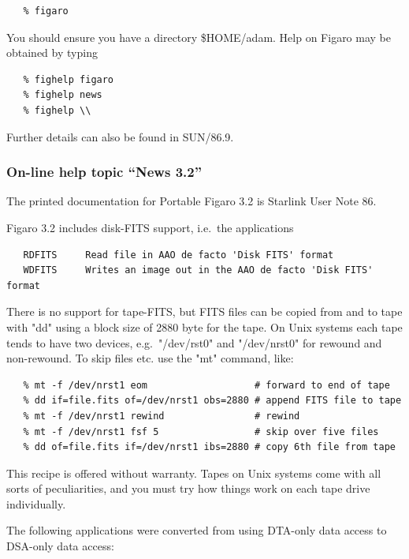 \documentclass[11pt,twoside]{article}
\begin{document}
\begin{verbatim}
   % figaro
\end{verbatim}

   You should ensure you have a directory \$HOME/adam.  Help on Figaro
   may be obtained by typing

\begin{verbatim}
   % fighelp figaro
   % fighelp news
   % fighelp \\
\end{verbatim}

   Further details can also be found in SUN/86.9.


\subsubsection{On-line help topic ``News 3.2''}

   The printed documentation for Portable Figaro 3.2 is Starlink User
   Note 86.

   Figaro 3.2 includes disk-FITS support, i.e.\ the applications

\begin{verbatim}
   RDFITS     Read file in AAO de facto 'Disk FITS' format
   WDFITS     Writes an image out in the AAO de facto 'Disk FITS' format
\end{verbatim}

   There is no support for tape-FITS, but FITS files can be copied from
   and to tape with "dd" using a block size of 2880 byte for the tape.
   On Unix systems each tape tends to have two devices, e.g.\ "/dev/rst0"
   and "/dev/nrst0" for rewound and non-rewound.  To skip files etc. use
   the "mt" command, like:

\begin{verbatim}
   % mt -f /dev/nrst1 eom                   # forward to end of tape
   % dd if=file.fits of=/dev/nrst1 obs=2880 # append FITS file to tape
   % mt -f /dev/nrst1 rewind                # rewind
   % mt -f /dev/nrst1 fsf 5                 # skip over five files
   % dd of=file.fits if=/dev/nrst1 ibs=2880 # copy 6th file from tape
\end{verbatim}

   This recipe is offered without warranty.  Tapes on Unix systems come
   with all sorts of peculiarities, and you must try how things work on
   each tape drive individually.

   The following applications were converted from using DTA-only data
   access to DSA-only data access:
\end{document}
